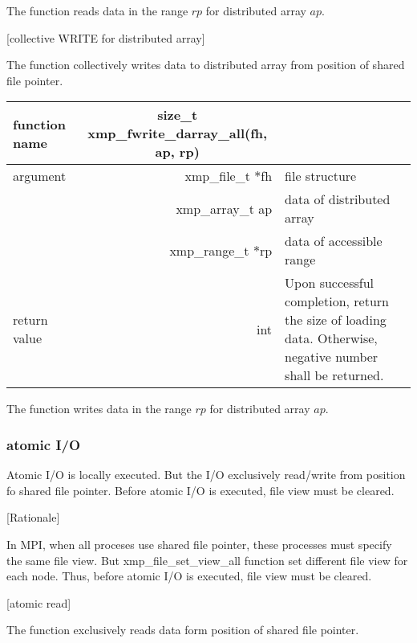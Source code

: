    The function reads data in the range $rp$ for distributed array $ap$.

   [collective WRITE for distributed array]

   The function collectively writes data to distributed array from
   position of shared file pointer.

   \begin{table}[h]
    \begin{center}
     \begin{tabular}{l|r|p{70mm}}
      \hline
      {\bf function name}  & \multicolumn{1}{c}{\bf size\_t
      xmp\_fwrite\_darray\_all(fh, ap, rp)} &  \\ \hline
      argument & xmp\_file\_t $*$fh & file structure \\ \cline{2-3}
      & xmp\_array\_t ap & data of distributed array \\ \cline{2-3}
      & xmp\_range\_t $*$rp & data of accessible range \\ \hline
      return value & int & Upon successful completion, return the size
	      of loading data. Otherwise, negative number shall be
	      returned. \\ \hline
      \end{tabular}
     \end{center}
    \label{tb:aaa}
   \end{table}

   The function writes data in the range $rp$ for distributed array $ap$.

   \clearpage

   \subsubsection{atomic I/O}

   Atomic I/O is locally executed. But the I/O exclusively read/write
   from position fo shared file pointer. Before atomic I/O is executed,
   file view must be cleared.
   
   [Rationale]

   In MPI, when all proceses use shared file pointer, these processes
   must specify the same file view. But xmp\_file\_set\_view\_all
   function set different file view for each node.
   Thus, before atomic I/O is executed, file view must be cleared.

   [atomic read]

   The function exclusively reads data form position of shared file
   pointer.

